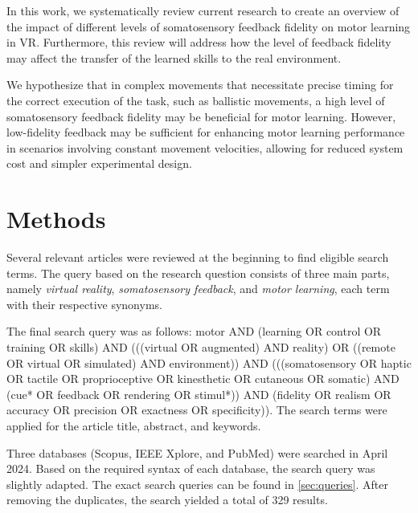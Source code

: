\documentclass[conference]{IEEEtran}
\begin{document}
In this work, we systematically review current research to create an overview of the impact of different levels of somatosensory feedback fidelity on motor learning in VR. Furthermore, this review will address how the level of feedback fidelity may affect the transfer of the learned skills to the real environment.

We hypothesize that in complex movements that necessitate precise timing for the correct execution of the task, such as ballistic movements, a high level of somatosensory feedback fidelity may be beneficial for motor learning. However, low-fidelity feedback may be sufficient for enhancing motor learning performance in scenarios involving constant movement velocities, allowing for reduced system cost and simpler experimental design. \newpage


\section{Methods}

Several relevant articles were reviewed at the beginning to find eligible search terms. The query based on the research question consists of three main parts, namely \textit{virtual reality}, \textit{somatosensory feedback}, and \textit{motor learning}, each term with their respective synonyms. 

The final search query was as follows: motor AND (learning OR control OR training OR skills) AND (((virtual OR augmented) AND reality) OR ((remote OR virtual OR simulated) AND environment)) AND (((somatosensory OR haptic OR tactile OR proprioceptive OR kinesthetic OR cutaneous OR somatic) AND 
(cue* OR feedback OR rendering OR stimul*)) AND (fidelity OR realism OR accuracy OR precision OR exactness OR specificity)). The search terms were applied for the article title, abstract, and keywords.

Three databases (Scopus, IEEE Xplore, and PubMed) were searched in April 2024. Based on the required syntax of each database, the search query was slightly adapted. The exact search queries can be found in \ref{sec:queries}.
After removing the duplicates, the search yielded a total of 329 results.
\end{document}
